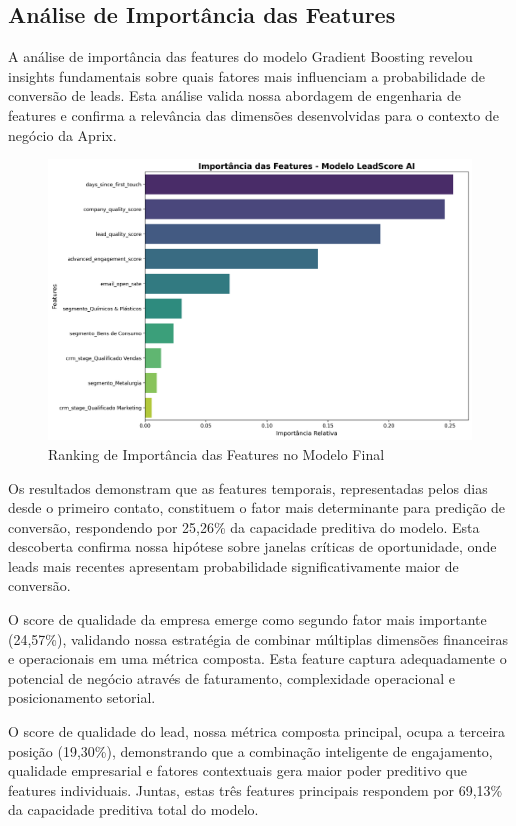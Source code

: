 \documentclass[portuguese,11pt]{article}
\begin{document}
\begin{table}[H]
\subsection{Análise de Importância das Features}
A análise de importância das features do modelo Gradient Boosting revelou insights fundamentais sobre quais fatores mais influenciam a probabilidade de conversão de leads. Esta análise valida nossa abordagem de engenharia de features e confirma a relevância das dimensões desenvolvidas para o contexto de negócio da Aprix.

\begin{figure}[H]
    \centering
    \includegraphics[width=0.8\linewidth]{feature_importance.png}
    \caption{Ranking de Importância das Features no Modelo Final}
    \label{fig:feature_importance}
\end{figure}

Os resultados demonstram que as features temporais, representadas pelos dias desde o primeiro contato, constituem o fator mais determinante para predição de conversão, respondendo por 25,26\% da capacidade preditiva do modelo. Esta descoberta confirma nossa hipótese sobre janelas críticas de oportunidade, onde leads mais recentes apresentam probabilidade significativamente maior de conversão.

O score de qualidade da empresa emerge como segundo fator mais importante (24,57\%), validando nossa estratégia de combinar múltiplas dimensões financeiras e operacionais em uma métrica composta. Esta feature captura adequadamente o potencial de negócio através de faturamento, complexidade operacional e posicionamento setorial.

O score de qualidade do lead, nossa métrica composta principal, ocupa a terceira posição (19,30\%), demonstrando que a combinação inteligente de engajamento, qualidade empresarial e fatores contextuais gera maior poder preditivo que features individuais. Juntas, estas três features principais respondem por 69,13\% da capacidade preditiva total do modelo.


\end{table}
\end{document}
